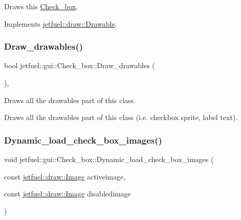 Draws this \hyperlink{classjetfuel_1_1gui_1_1Check__box}{Check\+\_\+box}. 

Implements \hyperlink{classjetfuel_1_1draw_1_1Drawable_a1a072070322965ce9411ee6e7c311c56}{jetfuel\+::draw\+::\+Drawable}.

\mbox{\label{classjetfuel_1_1gui_1_1Check__box_a481eeb0f2c5c6f1165da4243ab5b636a}} 
\subsubsection{\texorpdfstring{Draw\+\_\+drawables()}{Draw\_drawables()}}
{\footnotesize\ttfamily bool jetfuel\+::gui\+::\+Check\+\_\+box\+::\+Draw\+\_\+drawables (\begin{DoxyParamCaption}{ }\end{DoxyParamCaption})\hspace{0.3cm}{\ttfamily [inline]}, {\ttfamily [protected]}}



Draws all the drawables part of this class. 

Draws all the drawables part of this class (i.\+e. checkbox sprite, label text). \mbox{\label{classjetfuel_1_1gui_1_1Check__box_a9fd8ee85ef4f17195fbb7bcf53e061dc}} 
\subsubsection{\texorpdfstring{Dynamic\+\_\+load\+\_\+check\+\_\+box\+\_\+images()}{Dynamic\_load\_check\_box\_images()}}
{\footnotesize\ttfamily void jetfuel\+::gui\+::\+Check\+\_\+box\+::\+Dynamic\+\_\+load\+\_\+check\+\_\+box\+\_\+images (\begin{DoxyParamCaption}\item[{const \hyperlink{classjetfuel_1_1draw_1_1Image}{jetfuel\+::draw\+::\+Image}}]{activeimage,  }\item[{const \hyperlink{classjetfuel_1_1draw_1_1Image}{jetfuel\+::draw\+::\+Image}}]{disabledimage }\end{DoxyParamCaption})\hspace{0.3cm}{\ttfamily [inline]}}



